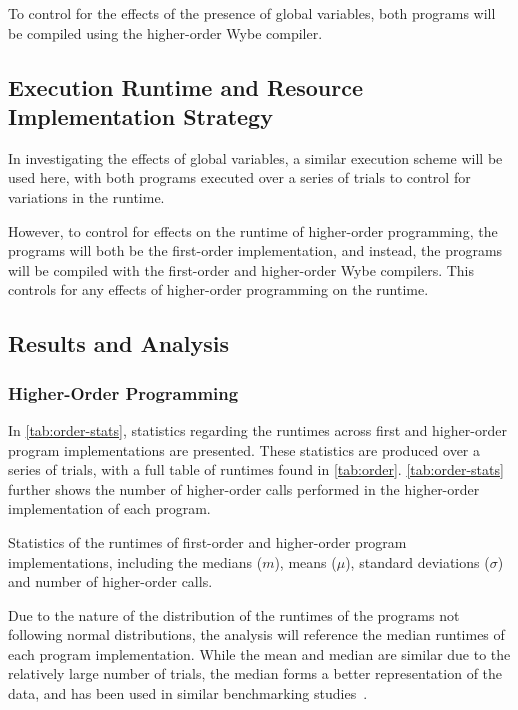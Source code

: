 To control for the effects of the presence of global variables, both programs will be compiled using the higher-order Wybe compiler. 


\subsection{Execution Runtime and Resource Implementation Strategy}

In investigating the effects of global variables, a similar execution scheme will be used here, with both programs executed over a series of trials to control for variations in the runtime. 

However, to control for effects on the runtime of higher-order programming, the programs will both be the first-order implementation, and instead, the programs will be compiled with the first-order and higher-order Wybe compilers. This controls for any effects of higher-order programming on the runtime.

\subsection{Results and Analysis}

\subsubsection{Higher-Order Programming}

In \cref{tab:order-stats}, statistics regarding the runtimes across first and higher-order program implementations are presented. These statistics are produced over a series of \ntrials{} trials, with a full table of runtimes found in \cref{tab:order}. \cref{tab:order-stats} further shows the number of higher-order calls performed in the higher-order implementation of each program. 

\begin{table}[ht]
  \centering
  \caption[Statistics of the runtimes of first-order and higher-order program implementations.]{Statistics of the runtimes of first-order and higher-order program implementations, including the medians ($m$), means ($\mu$), standard deviations ($\sigma$) and number of higher-order calls.}
  \label{tab:order-stats}
\end{table}

Due to the nature of the distribution of the runtimes of the programs not following normal distributions, the analysis will reference the median runtimes of each program implementation. While the mean and median are similar due to the relatively large number of trials, the median forms a better representation of the data, and has been used in similar benchmarking studies~\cite{leissa2015graph}.

